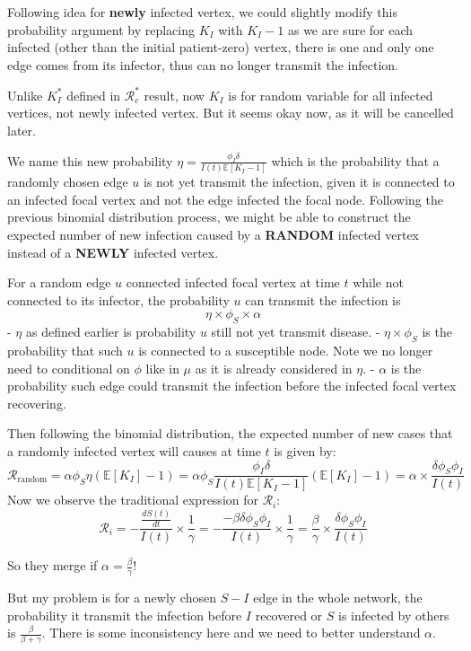 \documentclass[
]{article}
\begin{document}
Following idea for \textbf{newly} infected vertex, we could slightly
modify this probability argument by replacing \(K_I\) with \(K_I-1\) as
we are sure for each infected (other than the initial patient-zero)
vertex, there is one and only one edge comes from its infector, thus can
no longer transmit the infection.

Unlike \(K^*_I\) defined in \(\mathcal{R}^*_c\) result, now \(K_I\) is
for random variable for all infected vertices, not newly infected
vertex. But it seems okay now, as it will be cancelled later.

We name this new probability
\(\eta=\frac{\phi_I \delta}{I(t) \mathbb{E}[K_I-1]}\) which is the
probability that a randomly chosen edge \(u\) is not yet transmit the
infection, given it is connected to an infected focal vertex and not the
edge infected the focal node. Following the previous binomial
distribution process, we might be able to construct the expected number
of new infection caused by a \textbf{RANDOM} infected vertex instead of
a \textbf{NEWLY} infected vertex.

For a random edge \(u\) connected infected focal vertex at time \(t\)
while not connected to its infector, the probability \(u\) can transmit
the infection is \[\eta \times \phi_S \times \alpha\] - \(\eta\) as
defined earlier is probability \(u\) still not yet transmit disease. -
\(\eta\times\phi_S\) is the probability that such \(u\) is connected to
a susceptible node. Note we no longer need to conditional on \(\phi\)
like in \(\mu\) as it is already considered in \(\eta\). - \(\alpha\) is
the probability such edge could transmit the infection before the
infected focal vertex recovering.

Then following the binomial distribution, the expected number of new
cases that a randomly infected vertex will causes at time \(t\) is given
by:
\[\mathcal{R}_\text{random}=\alpha \phi_S\eta (\mathbb{E}[K_I]-1)=\alpha \phi_S \frac{\phi_I \delta}{I(t) \mathbb{E}[K_I-1]} (\mathbb{E}[K_I]-1)=\alpha \times \frac{\delta \phi_S \phi_I}{I(t)}\]
Now we observe the traditional expression for \(\mathcal{R}_{i}\):
\[\mathcal{R}_{i}=-\frac{\frac{dS(t)}{dt}}{I(t)}\times\frac{1}{\gamma}=-\frac{-\beta \delta\phi_S\phi_I}{I(t)}\times\frac{1}{\gamma}=\frac{\beta}{\gamma}\times \frac{\delta \phi_S \phi_I}{I(t)}\]

So they merge if \(\alpha=\frac{\beta}{\gamma}\)!

But my problem is for a newly chosen \(S-I\) edge in the whole network,
the probability it transmit the infection before \(I\) recovered or
\(S\) is infected by others is \(\frac{\beta}{\beta+\gamma}\). There is
some inconsistency here and we need to better understand \(\alpha\).
\end{document}
